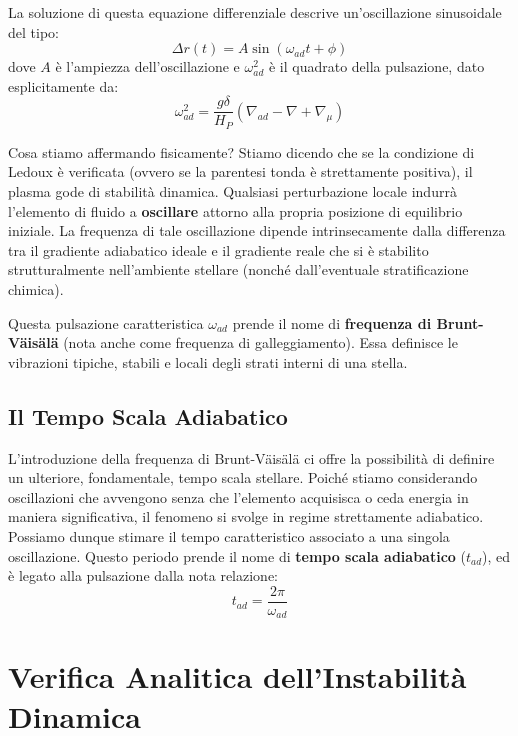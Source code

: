 La soluzione di questa equazione differenziale descrive un'oscillazione sinusoidale del tipo:
\begin{equation}
\Delta r(t) = A \sin(\omega_{ad} t + \phi)
\end{equation}
dove $A$ è l'ampiezza dell'oscillazione e $\omega_{ad}^2$ è il quadrato della pulsazione, dato esplicitamente da:
\begin{equation}
\omega_{ad}^2 = \frac{g \delta}{H_P} \left( \nabla_{ad} - \nabla + \nabla_\mu \right)
\end{equation}

Cosa stiamo affermando fisicamente? Stiamo dicendo che se la condizione di Ledoux è verificata (ovvero se la parentesi tonda è strettamente positiva), il plasma gode di stabilità dinamica. Qualsiasi perturbazione locale indurrà l'elemento di fluido a \textbf{oscillare} attorno alla propria posizione di equilibrio iniziale.
La frequenza di tale oscillazione dipende intrinsecamente dalla differenza tra il gradiente adiabatico ideale e il gradiente reale che si è stabilito strutturalmente nell'ambiente stellare (nonché dall'eventuale stratificazione chimica).

Questa pulsazione caratteristica $\omega_{ad}$ prende il nome di \textbf{frequenza di Brunt-Väisälä} (nota anche come frequenza di galleggiamento). Essa definisce le vibrazioni tipiche, stabili e locali degli strati interni di una stella.

\subsection{Il Tempo Scala Adiabatico}

L'introduzione della frequenza di Brunt-Väisälä ci offre la possibilità di definire un ulteriore, fondamentale, tempo scala stellare.
Poiché stiamo considerando oscillazioni che avvengono senza che l'elemento acquisisca o ceda energia in maniera significativa, il fenomeno si svolge in regime strettamente adiabatico. Possiamo dunque stimare il tempo caratteristico associato a una singola oscillazione.
Questo periodo prende il nome di \textbf{tempo scala adiabatico} ($t_{ad}$), ed è legato alla pulsazione dalla nota relazione:
\begin{equation}
t_{ad} = \frac{2\pi}{\omega_{ad}}
\end{equation}

\section{Verifica Analitica dell'Instabilità Dinamica}

